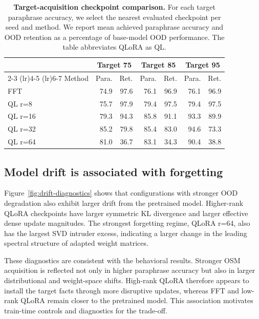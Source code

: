 \documentclass[11pt]{article}
\begin{document}
\begin{table}[htbp]
\centering
\small
\begin{tabular}{lrrrrrr}
\toprule
& \multicolumn{2}{c}{Target 75} 
& \multicolumn{2}{c}{Target 85}
& \multicolumn{2}{c}{Target 95} \\
\cmidrule(lr){2-3}
\cmidrule(lr){4-5}
\cmidrule(lr){6-7}
Method & Para. & Ret. & Para. & Ret. & Para. & Ret. \\
\midrule
FFT        & 74.9 & 97.6 & 76.1 & 96.9 & 76.1 & 96.9 \\
QL r=8  & 75.7 & 97.9 & 79.4 & 97.5 & 79.4 & 97.5 \\
QL r=16 & 79.3 & 94.3 & 85.8 & 91.1 & 93.3 & 89.9 \\
QL r=32 & 85.2 & 79.8 & 85.4 & 83.0 & 94.6 & 73.3 \\
QL r=64 & 81.0 & 36.7 & 83.1 & 34.3 & 90.4 & 38.8 \\
\bottomrule
\end{tabular}
\caption{
\textbf{Target-acquisition checkpoint comparison.}
For each target paraphrase accuracy, we select the nearest evaluated checkpoint
per seed and method. We report mean
achieved paraphrase accuracy and OOD retention as a percentage of base-model
OOD performance. 
The table abbreviates
QLoRA as QL.
}
\label{tab:matched-acquisition}
\end{table}


\subsection{Model drift is associated with forgetting}

Figure~\ref{fig:drift-diagnostics} shows that configurations with stronger
OOD degradation also exhibit larger drift from the pretrained model. Higher-rank
QLoRA checkpoints have larger symmetric KL divergence and larger effective dense
update magnitudes. The strongest forgetting regime, QLoRA r=64, also has the
largest SVD intruder excess, indicating a larger change in the leading spectral
structure of adapted weight matrices.

These diagnostics are consistent with the behavioral results. Stronger OSM
acquisition is reflected not only in higher paraphrase accuracy but also in larger
distributional and weight-space shifts. High-rank QLoRA
therefore appears to install the target facts through more disruptive updates,
whereas FFT and low-rank QLoRA remain closer to the pretrained model.
This association motivates train-time controls and diagnostics for the trade-off.
\end{document}
